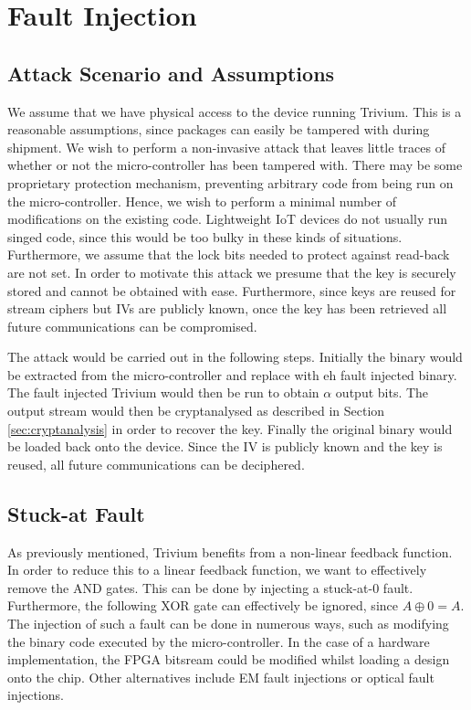 \documentclass[conference]{IEEEtran}
\begin{document}
\section{Fault Injection}

\subsection{Attack Scenario and Assumptions}

We assume that we have physical access to the device running Trivium. This is a reasonable assumptions, since packages can easily be tampered with during shipment. We wish to perform a non-invasive attack that leaves little traces of whether or not the micro-controller has been tampered with. There may be some proprietary protection mechanism, preventing arbitrary code from being run on the micro-controller. Hence, we wish to perform a minimal number of modifications on the existing code. Lightweight IoT devices do not usually run singed code, since this would be too bulky in these kinds of situations. Furthermore, we assume that the lock bits needed to protect against read-back are not set. In order to motivate this attack we presume that the key is securely stored and cannot be obtained with ease. Furthermore, since keys are reused for stream ciphers but IVs are publicly known, once the key has been retrieved all future communications can be compromised. 

The attack would be carried out in the following steps. Initially the binary would be extracted from the micro-controller and replace with eh fault injected binary. The fault injected Trivium would then be run to obtain $\alpha$ output bits. The output stream would then be cryptanalysed as described in Section \ref{sec:cryptanalysis} in order to recover the key. Finally the original binary would be loaded back onto the device. Since the IV is publicly known and the key is reused, all future communications can be deciphered.

\subsection{Stuck-at Fault}

As previously mentioned, Trivium benefits from a non-linear feedback function. In order to reduce this to a linear feedback function, we want to effectively remove the AND gates. This can be done by injecting a stuck-at-0 fault. Furthermore, the following XOR gate can effectively be ignored, since $A\oplus0=A$. The injection of such a fault can be done in numerous ways, such as modifying the binary code executed by the micro-controller. In the case of a hardware implementation, the FPGA bitsream could be modified whilst loading a design onto the chip. Other alternatives include EM fault injections or optical fault injections.
\end{document}
